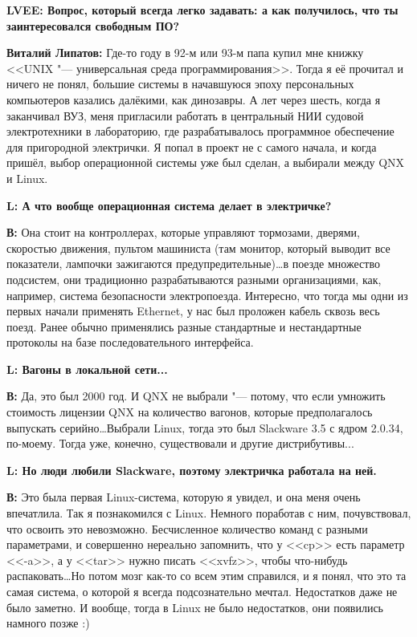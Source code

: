 \documentclass[10pt, a5paper]{article}
\begin{document}
{\noindent \bf LVEE: Вопрос, который всегда легко задавать: а как получилось, что ты заинтересовался свободным ПО?}

{\noindent \bf Виталий Липатов:} Где-то году в 92-м или 93-м папа купил мне книжку <<UNIX "--- универсальная среда программирования>>. Тогда я её прочитал и ничего не понял, большие системы в начавшуюся эпоху персональных компьютеров казались далёкими, как динозавры. А лет через шесть, когда я заканчивал ВУЗ, меня пригласили работать в центральный НИИ судовой электротехники в лабораторию, где разрабатывалось программное обеспечение для пригородной электрички. Я попал в проект не с самого начала, и когда пришёл, выбор операционной системы уже был сделан, а выбирали между QNX и Linux. 

{\noindent \bf L: А что вообще операционная система делает в электричке?}

{\noindent \bf В:} Она стоит на контроллерах, которые управляют тормозами, дверями, скоростью движения,  пультом машиниста (там монитор, который выводит все показатели, лампочки зажигаются предупредительные)\ldots в поезде множество подсистем, они традиционно разрабатываются разными организациями, как, например, система безопасности электропоезда. Интересно, что тогда мы одни из первых начали применять Ethernet, у нас был проложен кабель сквозь весь поезд. Ранее обычно применялись разные стандартные и нестандартные протоколы на базе последовательного интерфейса.

{\noindent \bf L: Вагоны в локальной сети...}

{\noindent \bf В:} Да, это был 2000 год. И QNX не выбрали "--- потому, что если умножить стоимость лицензии QNX на количество вагонов, которые предполагалось выпускать серийно\ldots Выбрали Linux, тогда это был Slackware 3.5 с ядром 2.0.34, по-моему. Тогда уже, конечно, существовали и другие дистрибутивы...

{\noindent \bf L: Но люди любили Slackware, поэтому электричка работала на ней.}

{\noindent \bf В:} Это была первая Linux-система, которую я увидел, и она меня очень впечатлила. Так я познакомился с Linux. Немного поработав с ним, почувствовал, что освоить это невозможно. Бесчисленное количество команд с разными параметрами, и совершенно нереально запомнить, что у <<cp>>  есть параметр <<-a>>, а у <<tar>> нужно писать <<xvfz>>, чтобы что-нибудь распаковать\ldots Но потом мозг как-то со всем этим справился, и я понял, что это та самая система, о которой я всегда подсознательно мечтал. Недостатков даже не было заметно. И вообще, тогда в Linux не было недостатков, они появились намного позже :)
\end{document}
